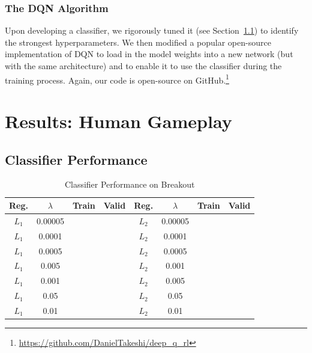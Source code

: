 \documentclass[letterpaper, 10pt, conference]{ieeeconf}
\begin{document}
\subsubsection{The DQN Algorithm} Upon developing a classifier, we rigorously
tuned it (see Section~\ref{ssec:results_classifier}) to identify the strongest
hyperparameters. We then modified a popular open-source implementation of DQN to
load in the model weights into a new network (but with the same architecture)
and to enable it to use the classifier during the training process. Again, our
code is open-source on
GitHub.\footnote{\url{https://github.com/DanielTakeshi/deep_q_rl}}



\section{Results: Human Gameplay}\label{sec:results_p1}

\subsection{Classifier Performance}\label{ssec:results_classifier}

\begin{table}[!t]
\renewcommand{\arraystretch}{1.3}
\caption{Classifier Performance on Breakout}
\label{tab:breakout}
\centering
\begin{tabular}{c c c c | c c c c}
\hline
Reg.  & $\lambda$ & Train & Valid & Reg.  & $\lambda$ & Train & Valid \\
\hline
$L_1$ & 0.00005   &   &   & $L_2$ & 0.00005   &   &  \\
$L_1$ & 0.0001    &   &   & $L_2$ & 0.0001    &   &  \\
$L_1$ & 0.0005    &   &   & $L_2$ & 0.0005    &   &  \\
$L_1$ & 0.005     &   &   & $L_2$ & 0.001     &   &  \\
$L_1$ & 0.001     &   &   & $L_2$ & 0.005     &   &  \\
$L_1$ & 0.05      &   &   & $L_2$ & 0.05      &   &  \\
$L_1$ & 0.01      &   &   & $L_2$ & 0.01      &   &  \\
\hline
\end{tabular}
\end{table}
\end{document}
